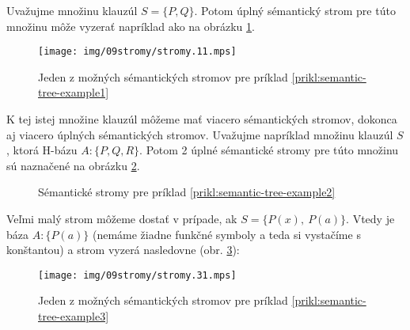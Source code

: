 \begin{priklad}
    \label{prikl:semantic-tree-example1}
    Uvažujme množinu klauzúl $S = \{P,Q\}$. Potom úplný sémantický strom
    pre túto množinu môže vyzerať napríklad ako na obrázku
    \ref{fig:semantic-tree-example1}.

    \begin{figure}[h]
        \centering
        \texttt{[image: img/09stromy/stromy.11.mps]}
        \caption{Jeden z možných sémantických stromov pre príklad
                \ref{prikl:semantic-tree-example1}}
        \label{fig:semantic-tree-example1}
    \end{figure}
\end{priklad}

\begin{priklad}
    \label{prikl:semantic-tree-example2}
    K tej istej množine klauzúl môžeme mať viacero sémantických stromov,
    dokonca aj viacero úplných sémantických stromov.
    Uvažujme napríklad množinu klauzúl $S$, ktorá H-bázu $A: \{ P, Q, R \}$.
    Potom 2 úplné sémantické stromy pre túto množinu sú naznačené na
    obrázku
    \ref{fig:semantic-tree-example2}.

    \begin{figure}[h]
        \centering
        \caption{Sémantické stromy pre príklad
                \ref{prikl:semantic-tree-example2}}
        \label{fig:semantic-tree-example2}
    \end{figure}
\end{priklad}


\begin{priklad}
    \label{prikl:semantic-tree-example3}
    Veľmi malý strom môžeme dostať v prípade, ak $S=\{P(x),\ P(a)\}$. Vtedy
    je báza $A:\{P(a)\}$ (nemáme žiadne funkčné symboly a teda si vystačíme
    s konštantou) a strom vyzerá nasledovne (obr.
    \ref{fig:semantic-tree-example3}):

    \begin{figure}[h]
        \centering
        \texttt{[image: img/09stromy/stromy.31.mps]}
        \caption{Jeden z možných sémantických stromov pre príklad
                \ref{prikl:semantic-tree-example3}}
        \label{fig:semantic-tree-example3}
    \end{figure}
\end{priklad}

